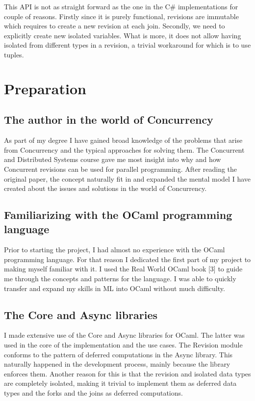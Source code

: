 \documentclass[12pt,twoside,notitlepage]{report}
\begin{document}
This API is not as straight forward as the one in the C\# implementations for couple of reasons. Firstly since it is purely functional, revisions are immutable which requires to create a new revision at each join. Secondly, we need to explicitly create new isolated variables. What is more, it does not allow having isolated from different types in a revision, a trivial workaround for which is to use tuples.  




\cleardoublepage



\chapter{Preparation}
\section{The author in the world of Concurrency}
As part of my degree I have gained broad knowledge of the problems that arise from Concurrency and the typical approaches for solving them. The Concurrent and Distributed Systems course gave me most insight into why and how Concurrent revisions can be used for parallel programming. After reading the original paper, the concept naturally fit in and expanded the mental model I have created about the issues and solutions in the world of Concurrency.  

\section{Familiarizing with the OCaml programming language}
Prior to starting the project, I had almost no experience with the OCaml programming language. For that reason I dedicated the first part of my project to making myself familiar with it. I used the Real World OCaml book [3] to guide me through the concepts and patterns for the language. I was able to quickly transfer and expand my skills in ML into OCaml without much difficulty.

\section{The Core and Async libraries}
I made extensive use of the Core and Async libraries for OCaml. The latter was used in the core of the implementation and the use cases. The Revision module conforms to the pattern of deferred computations in the Async library. This naturally happened in the development process, mainly because the library enforces them. Another reason for this is that the revision and isolated data types are completely isolated, making it trivial to implement them as deferred data types and the forks and the joins as deferred computations.  
\end{document}
